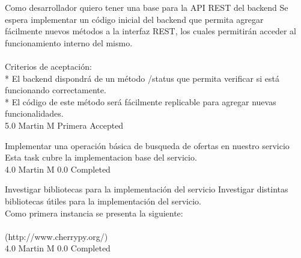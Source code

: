 	{Como desarrollador quiero tener una base para la API REST del backend} %
	{Se espera implementar un código inicial del backend que permita agregar\\
fácilmente nuevos métodos a la interfaz REST, los cuales permitirán acceder al\\
funcionamiento interno del mismo.\\
  \\
Criterios de aceptación:\\
* El backend dispondrá de un método /status que permita verificar si está funcionando correctamente.   \\
* El código de este método será fácilmente replicable para agregar nuevas funcionalidades.\\
} %
	{} %
	{5.0} %
	{Martin M} %
	{Primera} %
	{Accepted} %

		{Implementar una operación básica de busqueda de ofertas en nuestro servicio} %
		{Esta task cubre la implementacion base del servicio.\\
} %
		{4.0} %
		{Martin M} %
		{0.0} %
		{Completed} %

		{Investigar bibliotecas para la implementación del servicio} %
		{Investigar distintas bibliotecas útiles para la implementación del servicio.\\
Como primera instancia se presenta la siguiente:\\
  \\
[http://www.cherrypy.org/](http://www.cherrypy.org/)\\
} %
		{4.0} %
		{Martin M} %
		{0.0} %
		{Completed} %


\vspace{20pt}

